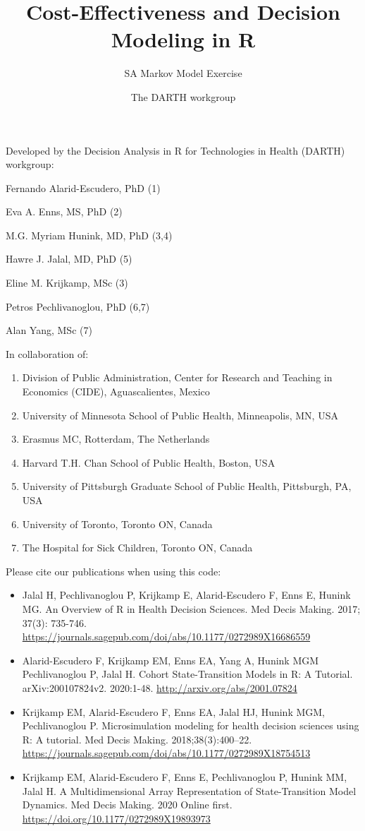\documentclass[
]{article}
\title{Cost-Effectiveness and Decision Modeling in R}
\subtitle{SA Markov Model Exercise}
\author{The DARTH workgroup}
\date{}
\providecommand{\tightlist}{%
  \setlength{\itemsep}{0pt}\setlength{\parskip}{0pt}}
\begin{document}
\maketitle

Developed by the Decision Analysis in R for Technologies in Health
(DARTH) workgroup:

Fernando Alarid-Escudero, PhD (1)

Eva A. Enns, MS, PhD (2)

M.G. Myriam Hunink, MD, PhD (3,4)

Hawre J. Jalal, MD, PhD (5)

Eline M. Krijkamp, MSc (3)

Petros Pechlivanoglou, PhD (6,7)

Alan Yang, MSc (7)

In collaboration of:

\begin{enumerate}
\def\labelenumi{\arabic{enumi}.}
\tightlist
\item
  Division of Public Administration, Center for Research and Teaching in
  Economics (CIDE), Aguascalientes, Mexico
\item
  University of Minnesota School of Public Health, Minneapolis, MN, USA
\item
  Erasmus MC, Rotterdam, The Netherlands
\item
  Harvard T.H. Chan School of Public Health, Boston, USA
\item
  University of Pittsburgh Graduate School of Public Health, Pittsburgh,
  PA, USA
\item
  University of Toronto, Toronto ON, Canada
\item
  The Hospital for Sick Children, Toronto ON, Canada
\end{enumerate}

Please cite our publications when using this code:

\begin{itemize}
\item
  Jalal H, Pechlivanoglou P, Krijkamp E, Alarid-Escudero F, Enns E,
  Hunink MG. An Overview of R in Health Decision Sciences. Med Decis
  Making. 2017; 37(3): 735-746.
  \url{https://journals.sagepub.com/doi/abs/10.1177/0272989X16686559}
\item
  Alarid-Escudero F, Krijkamp EM, Enns EA, Yang A, Hunink MGM
  Pechlivanoglou P, Jalal H. Cohort State-Transition Models in R: A
  Tutorial. arXiv:200107824v2. 2020:1-48.
  \url{http://arxiv.org/abs/2001.07824}
\item
  Krijkamp EM, Alarid-Escudero F, Enns EA, Jalal HJ, Hunink MGM,
  Pechlivanoglou P. Microsimulation modeling for health decision
  sciences using R: A tutorial. Med Decis Making. 2018;38(3):400--22.
  \url{https://journals.sagepub.com/doi/abs/10.1177/0272989X18754513}
\item
  Krijkamp EM, Alarid-Escudero F, Enns E, Pechlivanoglou P, Hunink MM,
  Jalal H. A Multidimensional Array Representation of State-Transition
  Model Dynamics. Med Decis Making. 2020 Online first.
  \url{https://doi.org/10.1177/0272989X19893973}
\end{itemize}
\end{document}

